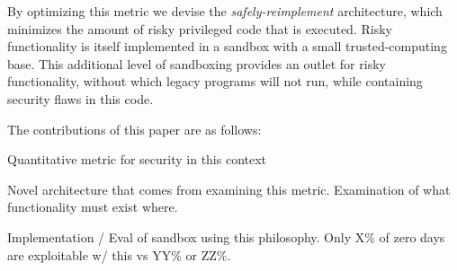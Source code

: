 By optimizing this metric   we devise the \emph{safely-reimplement}
architecture, which minimizes the amount of risky privileged code that is
executed.  
Risky functionality is itself implemented in a sandbox with
a small trusted-computing base.  
This additional level of sandboxing provides an outlet for risky functionality, without which
legacy programs will not run, while containing security flaws in this code.  

The contributions of this paper are as follows:

Quantitative metric for security in this context

Novel architecture that comes from examining this metric.  Examination of
what functionality must exist where.

Implementation / Eval of sandbox using this philosophy.  
Only X\% of zero days are exploitable w/ this vs YY\% or ZZ\%.



